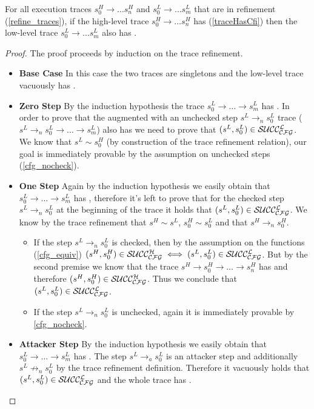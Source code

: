\begin{theorem}
\label{refine_traces_preserves_trace_has_cfi}
For all execution traces $s^H_0 \to \ldots s^H_n$ and $s^L_0 \to
\ldots s^L_m$ that are in refinement (\cref{refine_traces}), if the
high-level trace $s^H_0 \to \ldots s^H_n$ has \CFI
(\cref{traceHasCfi}) then the low-level trace $s^L_0 \to \ldots s^L_m$
also has \CFI.
\end{theorem}
\begin{proof}
  The proof proceeds by induction on the trace refinement.
  \begin{itemize}
  \item \textbf{Base Case} In this case the two traces are singletons
    and the low-level trace vacuously has \CFI.
  \item \textbf{Zero Step} By the induction hypothesis the trace
    $s^L_0 \to \ldots \to s^L_m$ has \CFI. In order to prove that the
    augmented with an unchecked step $s^L \to_n s^L_0$ trace ($s^L
    \to_n s^L_0 \to \ldots \to s^L_m$) also has \CFI we need to prove that
    $(s^L,s^L_0) \in \mathcal{SUCC_\mathcal{CFG}^{L}}$.  We know that $s^L \sim s^H_0$ (by
    construction of the trace refinement relation), our goal is
    immediately provable by the assumption on unchecked steps
    (\cref{cfg_nocheck}).
  \item \textbf{One Step} Again by the induction hypothesis we easily
    obtain that $s^L_0 \to \ldots \to s^L_m$ has \CFI, therefore it's
    left to prove that for the checked step $s^L \to_n s^L_0$ at the
    beginning of the trace it holds that $(s^L,s^L_0) \in
    \mathcal{SUCC_\mathcal{CFG}^{L}}$. We know by the trace refinement that $s^H \sim s^L$,
    $s^H_0 \sim s^L_0$ and that $s^H \to_n s^H_0$.  
    \begin{itemize}
    \item If the step $s^L \to_n s^L_0$ is checked, then by the
      assumption on the \SUCC{} functions (\cref{cfg_equiv})
      $(s^H,s^H_0) \in \mathcal{SUCC_\mathcal{CFG}^{H}} \iff (s^L,s^L_0) \in \mathcal{SUCC_\mathcal{CFG}^{L}}$. But
      by the second premise we know that the trace $s^H \to s^H_0 \to
      \ldots \to s^H_n$ has \CFI and therefore $(s^H,s^H_0) \in
      \mathcal{SUCC_\mathcal{CFG}^{H}}$. Thus we conclude that $(s^L,s^L_0) \in \mathcal{SUCC_\mathcal{CFG}^{L}}$.
    \item If the step $s^L \to_n s^L_0$ is unchecked, again
      it is immediately provable by \cref{cfg_nocheck}.
    \end{itemize}
  \item \textbf{Attacker Step} By the induction hypothesis we easily
    obtain that $s^L_0 \to \ldots \to s^L_m$ has \CFI. The step $s^L
    \to_a s^L_0$ is an attacker step and additionally $s^L \not \to_n
    s^L_0$ by the trace refinement definition. Therefore it vacuously
    holds that $(s^L,s^L_0) \in \mathcal{SUCC_\mathcal{CFG}^{L}}$ and the whole trace has \CFI.
  \end{itemize}  
\end{proof}

